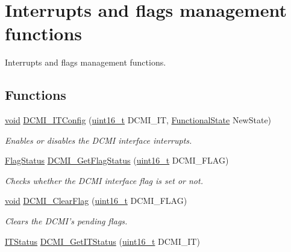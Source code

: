 \hypertarget{group___d_c_m_i___group3}{\section{Interrupts and flags management functions}
\label{group___d_c_m_i___group3}
}


Interrupts and flags management functions.  


\subsection*{Functions}
\begin{DoxyCompactItemize}
\item 
\hyperlink{group___n_a_m_e_ga18028b8badbf1ea7e704ccac3c488e82}{void} \hyperlink{group___d_c_m_i___group3_ga3d89fb10384dff1dfd9197fbb6c6b2eb}{D\-C\-M\-I\-\_\-\-I\-T\-Config} (\hyperlink{stdint_8h_a273cf69d639a59973b6019625df33e30}{uint16\-\_\-t} D\-C\-M\-I\-\_\-\-I\-T, \hyperlink{group___exported__types_gac9a7e9a35d2513ec15c3b537aaa4fba1}{Functional\-State} New\-State)
\begin{DoxyCompactList}\small\item\em Enables or disables the D\-C\-M\-I interface interrupts. \end{DoxyCompactList}\item 
\hyperlink{group___exported__types_ga89136caac2e14c55151f527ac02daaff}{Flag\-Status} \hyperlink{group___d_c_m_i___group3_ga1b66e1966fbea902a8e7015c56db7587}{D\-C\-M\-I\-\_\-\-Get\-Flag\-Status} (\hyperlink{stdint_8h_a273cf69d639a59973b6019625df33e30}{uint16\-\_\-t} D\-C\-M\-I\-\_\-\-F\-L\-A\-G)
\begin{DoxyCompactList}\small\item\em Checks whether the D\-C\-M\-I interface flag is set or not. \end{DoxyCompactList}\item 
\hyperlink{group___n_a_m_e_ga18028b8badbf1ea7e704ccac3c488e82}{void} \hyperlink{group___d_c_m_i___group3_ga1c93caf3ccfecf07cec8e1e0f844ddaa}{D\-C\-M\-I\-\_\-\-Clear\-Flag} (\hyperlink{stdint_8h_a273cf69d639a59973b6019625df33e30}{uint16\-\_\-t} D\-C\-M\-I\-\_\-\-F\-L\-A\-G)
\begin{DoxyCompactList}\small\item\em Clears the D\-C\-M\-I's pending flags. \end{DoxyCompactList}\item 
\hyperlink{group___exported__types_gaacbd7ed539db0aacd973a0f6eca34074}{I\-T\-Status} \hyperlink{group___d_c_m_i___group3_gac0b27821aab3ee6b73ae8a6c6339fed5}{D\-C\-M\-I\-\_\-\-Get\-I\-T\-Status} (\hyperlink{stdint_8h_a273cf69d639a59973b6019625df33e30}{uint16\-\_\-t} D\-C\-M\-I\-\_\-\-I\-T)

\end{DoxyCompactItemize}
